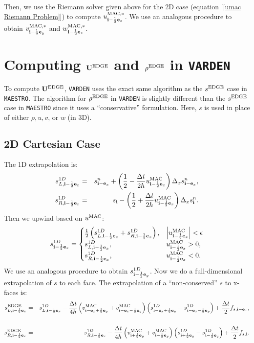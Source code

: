 \documentclass[11pt]{article}
\def\half  {\frac{1}{2}}
\def\dt    {\Delta t}
\def\edge  {\rm EDGE}
\def\mac   {\rm MAC}
\def\eb    {{\bf e}}
\def\ib    {{\bf i}}
\def\Ub    {{\bf U}}
\begin{document}
Then, we use the Riemann solver given above for the 2D case (equation [\ref{umac Riemann Problem}]) to compute $u_{\ib-\half\eb_x}^{\mac,*}$.  We use an analogous procedure to obtain $v_{\ib-\half\eb_y}^{\mac,*}$ and $w_{\ib-\half\eb_z}^{\mac,*}$.
\cleardoublepage
\section{Computing $\Ub^{\edge}$ and $\rho^{\edge}$ in {\tt VARDEN}}
To compute $\Ub^{\edge}$, {\tt VARDEN} uses the exact same algorithm as the $s^{\edge}$ case in {\tt MAESTRO}.  The algorithm for $\rho^{\edge}$ in {\tt VARDEN} is slightly different than the $s^{\edge}$ case in {\tt MAESTRO} since it uses a ``conservative'' formulation.  Here, $s$ is used in place of either $\rho, u, v$, or $w$ (in 3D).
\subsection{2D Cartesian Case}
The 1D extrapolation is:
\begin{eqnarray}
s_{L,\ib-\half\eb_x}^{1D} &=& s_{\ib-\eb_x}^n + \left(\half - \frac{\dt}{2h}u_{\ib-\half\eb_x}^{\mac}\right)\Delta_x s_{\ib-\eb_x}^n, \label{varden s_L^1D}\\
s_{R,\ib-\half\eb_x}^{1D} &=& s_{\ib} - \left(\half + \frac{\dt}{2h}u_{\ib-\half\eb_x}^{\mac}\right)\Delta_x s_{\ib}^n. \label{varden s_R^1D}
\end{eqnarray}
Then we upwind based on $u^{\mac}$:
\begin{equation}
s_{\ib-\half\eb_x}^{1D} =
\begin{cases}
\half\left(s_{L,\ib-\half\eb_x}^{1D} + s_{R,\ib-\half\eb_x}^{1D}\right), & \left|u^{\mac}_{\ib-\half\eb_x}\right| < \epsilon \\
s_{L,\ib-\half\eb_x}^{1D}, & u^{\mac}_{\ib-\half\eb_x} > 0, \\
s_{R,\ib-\half\eb_x}^{1D}, & u^{\mac}_{\ib-\half\eb_x} < 0. \\
\end{cases}
\end{equation}
We use an analogous procedure to obtain $s_{\ib-\half\eb_y}^{1D}$.  Now we do a full-dimensional extrapolation of $s$ to each face.  The extrapolation of a ``non-conserved'' $s$ to x-faces is:
\begin{eqnarray}
s_{L,\ib-\half\eb_x}^{\edge} &=& s_{L,\ib-\half\eb_x}^{1D} - \frac{\dt}{4h}\left(v_{\ib-\eb_x+\half\eb_y}^{\mac}+v_{\ib-\eb_x-\half\eb_y}^{\mac}\right)\left(s_{\ib-\eb_x+\half\eb_y}^{1D} - s_{\ib-\eb_x-\half\eb_y}^{1D}\right) + \frac{\dt}{2}f_{s,\ib-\eb_x}, \nonumber \\
&& \\
s_{R,\ib-\half\eb_x}^{\edge} &=& s_{R,\ib-\half\eb_x}^{1D} - \frac{\dt}{4h}\left(v_{\ib+\half\eb_y}^{\mac}+v_{\ib-\half\eb_y}^{\mac}\right)\left(s_{\ib+\half\eb_y}^{1D} - s_{\ib-\half\eb_y}^{1D}\right) + \frac{\dt}{2}f_{s,\ib}.
\end{eqnarray}
\end{document}
